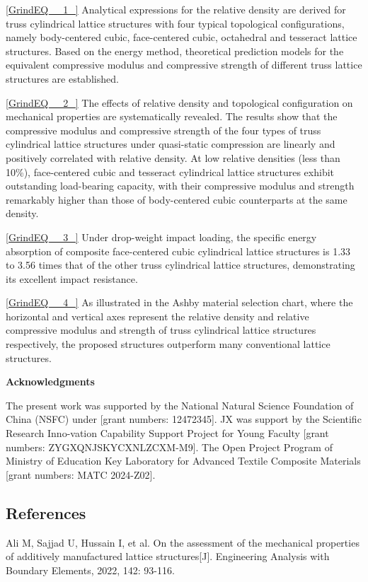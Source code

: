 \documentclass{article} %
\begin{document}
\eqref{GrindEQ__1_} Analytical expressions for the relative density are derived for truss cylindrical lattice structures with four typical topological configurations, namely body-centered cubic, face-centered cubic, octahedral and tesseract lattice structures. Based on the energy method, theoretical prediction models for the equivalent compressive modulus and compressive strength of different truss lattice structures are established.

\eqref{GrindEQ__2_} The effects of relative density and topological configuration on mechanical properties are systematically revealed. The results show that the compressive modulus and compressive strength of the four types of truss cylindrical lattice structures under quasi-static compression are linearly and positively correlated with relative density. At low relative densities (less than 10\%), face-centered cubic and tesseract cylindrical lattice structures exhibit outstanding load-bearing capacity, with their compressive modulus and strength remarkably higher than those of body-centered cubic counterparts at the same density.

\eqref{GrindEQ__3_} Under drop-weight impact loading, the specific energy absorption of composite face-centered cubic cylindrical lattice structures is 1.33 to 3.56 times that of the other truss cylindrical lattice structures, demonstrating its excellent impact resistance.

\eqref{GrindEQ__4_} As illustrated in the Ashby material selection chart, where the horizontal and vertical axes represent the relative density and relative compressive modulus and strength of truss cylindrical lattice structures respectively, the proposed structures outperform many conventional lattice structures.

\noindent \textbf{Acknowledgments}

The present work was supported by the National Natural Science Foundation of China (NSFC) under [grant numbers: 12472345]. JX was support by the Scientific Research Inno-vation Capability Support Project for Young Faculty [grant numbers: ZYGXQNJSKYCXNLZCXM-M9]. The Open Project Program of Ministry of Education Key Laboratory for Advanced Textile Composite Materials [grant numbers: MATC 2024-Z02].

\noindent 
\subsection{References}

\noindent [1] Ali M, Sajjad U, Hussain I, et al. On the assessment of the mechanical properties of additively manufactured lattice structures[J]. Engineering Analysis with Boundary Elements, 2022, 142: 93-116.
\end{document}
